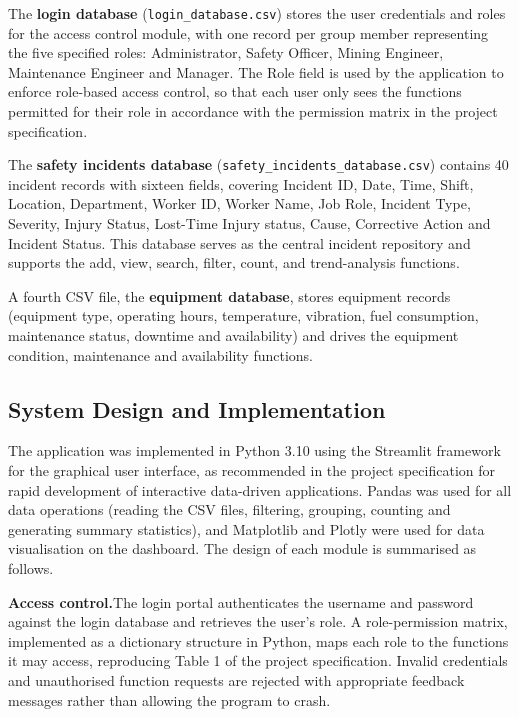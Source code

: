 \documentclass[
]{article}
\begin{document}
The \textbf{login database}
(\texttt{login\_database.csv}) stores the user credentials and roles
for the access control module, with one record per group member
representing the five specified roles: Administrator, Safety Officer,
Mining Engineer, Maintenance Engineer and Manager. The Role field is
used by the application to enforce role-based access control, so that
each user only sees the functions permitted for their role in
accordance with the permission matrix in the project specification.

The \textbf{safety incidents database}
(\texttt{safety\_incidents\_database.csv}) contains 40 incident
records with sixteen fields, covering Incident ID, Date, Time, Shift,
Location, Department, Worker ID, Worker Name, Job Role, Incident Type,
Severity, Injury Status, Lost-Time Injury status, Cause, Corrective
Action and Incident Status. This database serves as the central
incident repository and supports the add, view, search, filter, count,
and trend-analysis functions.

A fourth CSV file, the \textbf{equipment database}, stores equipment
records (equipment type, operating hours, temperature, vibration,
fuel consumption, maintenance status, downtime and availability) and
drives the equipment condition, maintenance and availability
functions.

\subsection{System Design and Implementation}

The application was implemented in Python 3.10 using the Streamlit framework for the graphical user interface, as recommended in the project specification for rapid development of interactive data-driven applications. Pandas was used for all data operations (reading the CSV files, filtering, grouping, counting and generating summary statistics), and Matplotlib and Plotly were used for data visualisation on the dashboard. The design of each module is summarised as follows.

\textbf{Access control.}The login portal authenticates the username and password against the login database and retrieves the user's role. A role-permission matrix, implemented as a dictionary structure in Python, maps each role to the functions it may access, reproducing Table 1 of the project specification. Invalid credentials and unauthorised function requests are rejected with appropriate feedback messages rather than allowing the program to crash.
\end{document}
